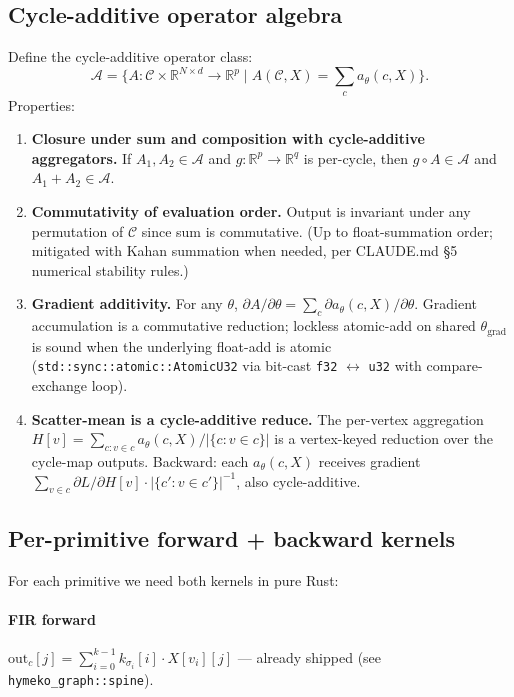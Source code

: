 \documentclass[10pt]{article}
\begin{document}
\subsection*{Cycle-additive operator algebra}

Define the cycle-additive operator class:
\[
  \mathcal{A} = \big\{ A : \mathcal{C} \times \mathbb{R}^{N \times d}
                       \to \mathbb{R}^p \mid
                       A(\mathcal{C}, X) = \sum_{c} a_\theta(c, X) \big\}.
\]
Properties:
\begin{enumerate}
  \item \textbf{Closure under sum and composition with cycle-additive
    aggregators.} If $A_1, A_2 \in \mathcal{A}$ and
    $g : \mathbb{R}^p \to \mathbb{R}^q$ is per-cycle, then
    $g \circ A \in \mathcal{A}$ and $A_1 + A_2 \in \mathcal{A}$.
  \item \textbf{Commutativity of evaluation order.} Output is
    invariant under any permutation of $\mathcal{C}$ since sum is
    commutative. (Up to float-summation order; mitigated with
    Kahan summation when needed, per CLAUDE.md \S5 numerical
    stability rules.)
  \item \textbf{Gradient additivity.} For any $\theta$,
    $\partial A / \partial \theta = \sum_c \partial a_\theta(c, X) / \partial \theta$.
    Gradient accumulation is a commutative reduction; lockless
    atomic-add on shared $\theta_{\text{grad}}$ is sound when the
    underlying float-add is atomic (\texttt{std::sync::atomic::AtomicU32}
    via bit-cast \texttt{f32} $\leftrightarrow$ \texttt{u32} with
    compare-exchange loop).
  \item \textbf{Scatter-mean is a cycle-additive reduce.} The
    per-vertex aggregation
    $H[v] = \sum_{c: v \in c} a_\theta(c, X) / |\{c: v \in c\}|$
    is a vertex-keyed reduction over the cycle-map outputs. Backward:
    each $a_\theta(c, X)$ receives gradient
    $\sum_{v \in c} \partial L / \partial H[v] \cdot
    |\{c': v \in c'\}|^{-1}$, also cycle-additive.
\end{enumerate}

\subsection*{Per-primitive forward + backward kernels}

For each primitive we need both kernels in pure Rust:

\paragraph{FIR forward}
$\mathrm{out}_c[j] = \sum_{i=0}^{k-1} k_{\sigma_i}[i] \cdot X[v_i][j]$
--- already shipped (see \texttt{hymeko\_graph::spine}).
\end{document}
